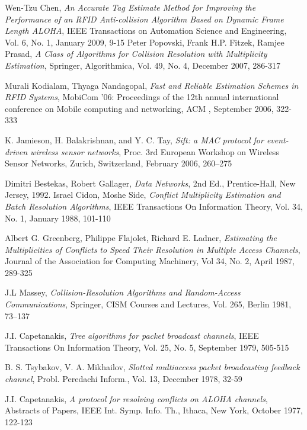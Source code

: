 \begin{thebibliography}{99}
 Wen-Tzu Chen, \emph{An Accurate Tag Estimate Method for Improving the Performance of an RFID Anti-collision Algorithm Based on Dynamic Frame Length ALOHA}, IEEE Transactions on Automation Science and Engineering, Vol. 6, No. 1, January 2009, 9-15
  Peter Popovski, Frank H.P. Fitzek, Ramjee Prasad, \emph{ A Class of Algorithms for Collision Resolution with Multiplicity Estimation}, Springer, Algorithmica, Vol. 49, No. 4, December 2007, 286-317
  
Murali Kodialam, Thyaga Nandagopal, \emph{Fast and Reliable Estimation Schemes in RFID Systems}, MobiCom '06: Proceedings of the 12th annual international conference on Mobile computing and networking, ACM , September 2006, 322-333 
 
K. Jamieson, H. Balakrishnan, and Y. C. Tay, \emph{Sift: a MAC protocol for event-driven wireless sensor networks},  Proc. 3rd European Workshop on Wireless Sensor Networks, Zurich, Switzerland, February 2006, 260–275 

Dimitri Bestekas, Robert Gallager, \emph{Data Networks}, 2nd Ed., Prentice-Hall, New Jersey, 1992.
 Israel Cidon, Moshe Side, \emph{Conflict Multiplicity Estimation and Batch Resolution Algorithms}, IEEE Transactions On Information Theory, Vol. 34, No. 1, January 1988, 101-110
 
  Albert G. Greenberg, Philippe Flajolet,  Richard E. Ladner,
  \emph{Estimating the Multiplicities of Conflicts to Speed Their Resolution in Multiple Access Channels},
  Journal of the Association for Computing Machinery,
  Vol 34, No. 2, April 1987, 289-325
 
  J.L Massey, \emph{Collision-Resolution Algorithms and Random-Access Communications}, Springer, CISM Courses and Lectures, Vol. 265, Berlin 1981, 73–137
  
  J.I. Capetanakis, \emph{ Tree algorithms for packet broadcast channels}, IEEE Transactions On Information Theory, Vol. 25, No. 5, September 1979, 505-515
 
B. S. Tsybakov, V. A. Mikhailov, \emph{Slotted multiaccess packet broadcasting feedback channel}, Probl. Peredachi Inform., Vol. 13, December 1978, 32-59
 
J.I. Capetanakis, \emph{A protocol for resolving conflicts on ALOHA channels}, Abstracts of Papers, IEEE Int. Symp. Info. Th., Ithaca, New York, October 1977, 122-123

 \end{thebibliography}
 
